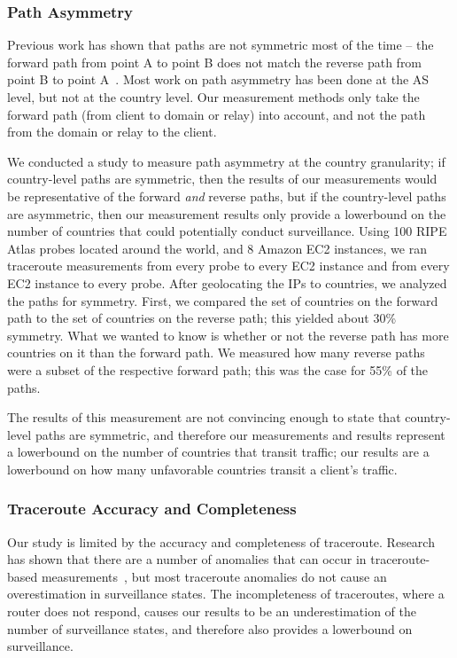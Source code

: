 \subsubsection{Path Asymmetry}
Previous work has shown that paths are not symmetric most of the time -- the forward path from point A to point B does not match the reverse path from point B to point A~\cite{he2005routing}.  Most work on path asymmetry has been done at the AS level, but not at the country level.  Our measurement methods only take the forward path (from client to domain or relay) into account, and not the path from the domain or relay to the client.  

We conducted a study to measure path asymmetry at the country granularity; if country-level paths are symmetric, then the results of our measurements would be representative of the forward {\it and} reverse paths, but if the country-level paths are asymmetric, then our measurement results only provide a lowerbound on the number of countries that could potentially conduct surveillance.  Using 100 RIPE Atlas probes located around the world, and 8 Amazon EC2 instances, we ran traceroute measurements from every probe to every EC2 instance and from every EC2 instance to every probe.  After geolocating the IPs to countries, we analyzed the paths for symmetry.  First, we compared the set of countries on the forward path to the set of countries on the reverse path; this yielded about 30\% symmetry.  What we wanted to know is whether or not the reverse path has more countries on it than the forward path.  We measured how many reverse paths were a subset of the respective forward path; this was the case for 55\% of the paths.  

The results of this measurement are not convincing enough to state that country-level paths are symmetric, and therefore our measurements and results represent a lowerbound on the number of countries that transit traffic; our results are a lowerbound on how many unfavorable countries transit a client's traffic.

\subsubsection{Traceroute Accuracy and Completeness}
Our study is limited by the accuracy and completeness of traceroute.  Research has shown that there are a number of anomalies that can occur in traceroute-based measurements~\cite{augustin2006avoiding}, but most traceroute anomalies do not cause an overestimation in surveillance states.  The incompleteness of traceroutes, where a router does not respond, causes our results to be an underestimation of the number of surveillance states, and therefore also provides a lowerbound on surveillance.
